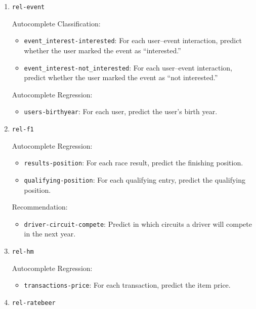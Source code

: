 \begin{enumerate}
  Autocomplete Regression:
  \begin{itemize}
    \item \texttt{studies-enrollment}: For each study, predict the enrollment count.
  \end{itemize}


  \item \texttt{rel-event}

  Autocomplete Classification:
  \begin{itemize}
    \item \texttt{event\_interest-interested}: For each user--event interaction, predict whether the user marked the event as ``interested.''
    \item \texttt{event\_interest-not\_interested}: For each user--event interaction, predict whether the user marked the event as ``not interested.''
  \end{itemize}

  Autocomplete Regression:
  \begin{itemize}
    \item \texttt{users-birthyear}: For each user, predict the user's birth year.
  \end{itemize}


  \item \texttt{rel-f1}

  Autocomplete Regression:
  \begin{itemize}
    \item \texttt{results-position}: For each race result, predict the finishing position.
    \item \texttt{qualifying-position}: For each qualifying entry, predict the qualifying position.
  \end{itemize}

  Recommendation:
  \begin{itemize}
    \item \texttt{driver-circuit-compete}: Predict in which circuits a driver will compete in the next year.
  \end{itemize}

  \item \texttt{rel-hm} 

  Autocomplete Regression:
  \begin{itemize}
    \item \texttt{transactions-price}: For each transaction, predict the item price.
  \end{itemize}

  \item \texttt{rel-ratebeer} 


\end{enumerate}
